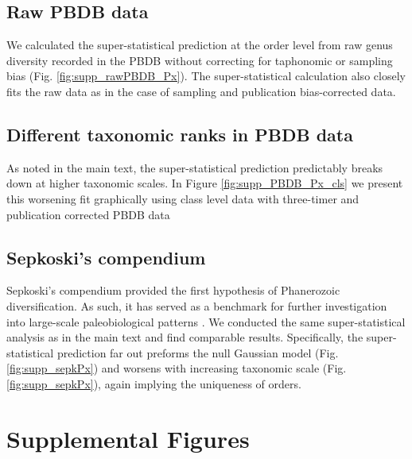 \documentclass[12pt]{article}
\let\citep=\autocite
\begin{document}
\subsection{Raw PBDB data} \label{sec:rawPBDB}
We calculated the super-statistical prediction at the order level from
raw genus diversity recorded in the PBDB without correcting for
taphonomic or sampling bias (Fig. \ref{fig:supp_rawPBDB_Px}). The
super-statistical calculation also closely fits the raw data as in the
case of sampling and publication bias-corrected data.

\subsection{Different taxonomic ranks in PBDB data}
As noted in the main text, the super-statistical prediction
predictably breaks down at higher taxonomic scales. In Figure
\ref{fig:supp_PBDB_Px_cls} we present this worsening fit graphically
using class level data with three-timer and publication corrected PBDB
data

\subsection{Sepkoski's compendium} \label{sec:suppSepk}
Sepkoski's compendium \citep{sepkoski1992} provided the first
hypothesis of Phanerozoic diversification.  As such, it has served as
a benchmark for further investigation into large-scale paleobiological
patterns \citep{alroy08}.  We conducted the same super-statistical
analysis as in the main text and find comparable results.
Specifically, the super-statistical prediction far out preforms the
null Gaussian model (Fig. \ref{fig:supp_sepkPx}) and worsens with
increasing taxonomic scale (Fig. \ref{fig:supp_sepkPx}), again
implying the uniqueness of orders.

\printbibliography

\clearpage

\section*{Supplemental Figures}
\end{document}
